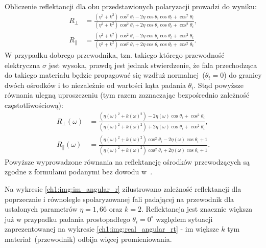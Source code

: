 Obliczenie reflektancji dla obu przedstawionych polaryzacji prowadzi do wyniku:
\begin{align}
\label{ch1:eq:RPerp_general}
R_\perp &= \frac{\left(\eta^2 + k^2\right)\cos^2\theta_t - 2\eta\cos\theta_i\cos\theta_t + \cos^2\theta_i}{\left(\eta^2 + k^2\right)\cos^2\theta_t + 2\eta\cos\theta_i\cos\theta_t + \cos^2\theta_i},\\
\label{ch1:eq:RParallel_general}
R_\parallel &= \frac{\left( \eta^2 + k^2 \right)\cos^2\theta_i - 2\eta\cos\theta_i\cos\theta_t + \cos^2\theta_t}{\left( \eta^2 + k^2 \right)\cos^2\theta_i + 2\eta\cos\theta_i\cos\theta_t + \cos^2\theta_t}.
\end{align}
W przypadku dobrego przewodnika, tzn. takiego którego przewodność elektryczna $\sigma$ jest wysoka, prawdą jest jednak stwierdzenie, że fala przechodząca do takiego materiału będzie propagować się wzdłuż normalnej~($\theta_t = 0$) do granicy dwóch ośrodków i to niezależnie od wartości kąta padania $\theta_i$. Stąd powyższe równania ulegną uproszczeniu (tym razem zaznaczając bezpośrednio zależność częstotliwościową):
\begin{align}
\label{ch1:eq:RPerp_conductor}
R_\perp(\omega) &= \frac{\left(\eta(\omega)^2 + k(\omega)^2\right) - 2\eta(\omega)\cos\theta_i + \cos^2\theta_i}{\left(\eta(\omega)^2 + k(\omega)^2\right) + 2\eta(\omega)\cos\theta_i + \cos^2\theta_i},\\
\label{ch1:eq:RParallel_conductor}
R_\parallel(\omega) &= \frac{\left( \eta(\omega)^2 + k(\omega)^2 \right)\cos^2\theta_i - 2\eta(\omega)\cos\theta_i + 1}{\left( \eta(\omega)^2 + k(\omega)^2 \right)\cos^2\theta_i + 2\eta(\omega)\cos\theta_i + 1}.
\end{align}
Powyższe wyprowadzone równania na reflektancję ośrodków przewodzących są zgodne z formułami podanymi bez dowodu w~\cite{PBRT}.

Na wykresie \ref{ch1:img:im_angular_r} zilustrowano zależność reflektancji dla poprzecznie i równolegle spolaryzowanej fali padającej na przewodnik dla ustalonych parametrów $\eta = 1,66$ oraz $k = 2$. Reflektancja jest znacznie większa już w przypadku padania prostopadłego $\theta_i = 0^\circ$ względem sytuacji zaprezentowanej na wykresie \ref{ch1:img:real_angular_rt} - im większe $k$ tym materiał~(przewodnik) odbija więcej promieniowania. 

